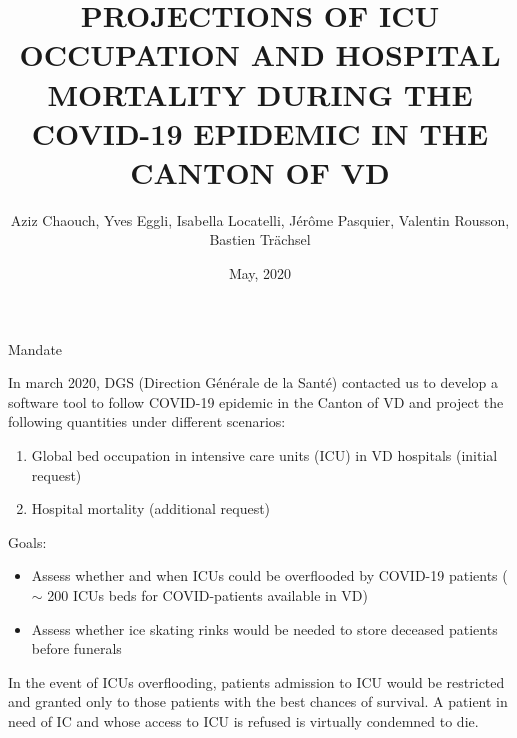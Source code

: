 \documentclass[t,9pt,xcolor=dvipsnames]{beamer}              %
\title{PROJECTIONS OF ICU OCCUPATION AND HOSPITAL MORTALITY DURING THE COVID-19 EPIDEMIC IN THE CANTON OF VD}
\subtitle{}
\author{Aziz Chaouch, Yves Eggli, Isabella Locatelli, Jérôme Pasquier, Valentin Rousson, Bastien Trächsel}
\institute{Center for Primary Care and Public Health (Unisanté), University of Lausanne, Switzerland}
\date{May, 2020}
\begin{document}
\begin{frame}
\titlepage

\note{
\tiny

}
\end{frame}

\begin{frame}{Mandate}
\justifying

In march 2020, DGS (Direction Générale de la Santé) contacted us to develop a software tool to follow COVID-19 epidemic in the Canton of VD and project the following quantities under different scenarios:
\begin{enumerate}
\item Global bed occupation in intensive care units (ICU) in VD hospitals (initial request)
\item Hospital mortality (additional request)
\end{enumerate}
\pause

\alert{Goals}: 
\begin{itemize}
\item Assess whether and when ICUs could be  overflooded by COVID-19 patients ($\sim$ 200 ICUs beds for COVID-patients available in VD)
\item Assess whether ice skating rinks would be needed to store deceased patients before funerals
\end{itemize}
\medskip

In the event of ICUs overflooding, patients admission to ICU would be restricted and granted only to those patients with the best chances of survival. A patient in need of IC and whose access to ICU is refused is virtually condemned to die.

\note{
\tiny
\justifying

}
\end{frame}
\end{document}
